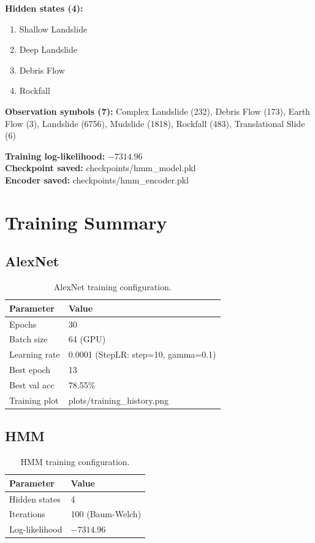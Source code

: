 \documentclass[11pt]{article}
\begin{document}
\noindent\textbf{Hidden states (4):}
\begin{enumerate}[noitemsep, start=0]
    \item Shallow Landslide
    \item Deep Landslide
    \item Debris Flow
    \item Rockfall
\end{enumerate}

\noindent\textbf{Observation symbols (7):}
Complex Landslide (232), Debris Flow (173), Earth Flow (3), Landslide (6756), Mudslide (1818), Rockfall (483), Translational Slide (6)

\vspace{0.3cm}
\noindent\textbf{Training log-likelihood:} $-7314.96$ \\
\textbf{Checkpoint saved:} checkpoints/hmm\_model.pkl \\
\textbf{Encoder saved:} checkpoints/hmm\_encoder.pkl

\section{Training Summary}

\subsection{AlexNet}
\begin{table}[h]
    \centering
    \begin{tabular}{@{}ll@{}}
        \toprule
        \textbf{Parameter} & \textbf{Value} \\ \midrule
        Epochs        & 30 \\
        Batch size    & 64 (GPU) \\
        Learning rate & 0.0001 (StepLR: step=10, gamma=0.1) \\
        Best epoch    & 13 \\
        Best val acc  & 78.55\% \\
        Training plot & plots/training\_history.png \\ \bottomrule
    \end{tabular}
    \caption{AlexNet training configuration.}
\end{table}

\subsection{HMM}
\begin{table}[h]
    \centering
    \begin{tabular}{@{}ll@{}}
        \toprule
        \textbf{Parameter} & \textbf{Value} \\ \midrule
        Hidden states  & 4 \\
        Iterations     & 100 (Baum-Welch) \\
        Log-likelihood & $-7314.96$ \\ \bottomrule
    \end{tabular}
    \caption{HMM training configuration.}
\end{table}
\end{document}
